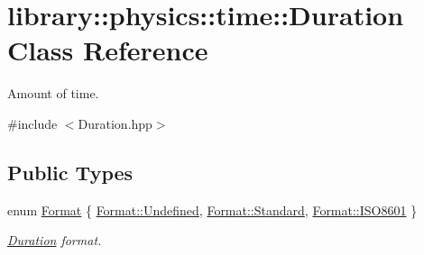 \hypertarget{classlibrary_1_1physics_1_1time_1_1_duration}{}\section{library\+:\+:physics\+:\+:time\+:\+:Duration Class Reference}
\label{classlibrary_1_1physics_1_1time_1_1_duration}


Amount of time.  




{\ttfamily \#include $<$Duration.\+hpp$>$}

\subsection*{Public Types}
\begin{DoxyCompactItemize}
\item 
enum \hyperlink{classlibrary_1_1physics_1_1time_1_1_duration_ace85659cafe97df992c0e4273bdc88d1}{Format} \{ \hyperlink{classlibrary_1_1physics_1_1time_1_1_duration_ace85659cafe97df992c0e4273bdc88d1aec0fc0100c4fc1ce4eea230c3dc10360}{Format\+::\+Undefined}, 
\hyperlink{classlibrary_1_1physics_1_1time_1_1_duration_ace85659cafe97df992c0e4273bdc88d1aeb6d8ae6f20283755b339c0dc273988b}{Format\+::\+Standard}, 
\hyperlink{classlibrary_1_1physics_1_1time_1_1_duration_ace85659cafe97df992c0e4273bdc88d1a35b6786739efcdc5a74ab1dca29d3b6b}{Format\+::\+I\+S\+O8601}
 \}\begin{DoxyCompactList}\small\item\em \hyperlink{classlibrary_1_1physics_1_1time_1_1_duration}{Duration} format. \end{DoxyCompactList}
\end{DoxyCompactItemize}
